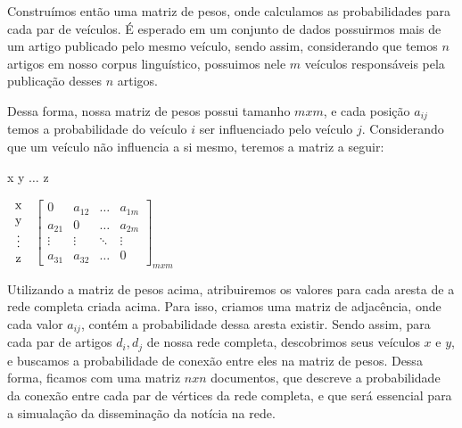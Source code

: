 \documentclass[a4paper,12pt]{article}
\begin{document}
 Construímos então uma matriz de pesos, onde calculamos as probabilidades para cada par de veículos. É esperado em um conjunto de 
 dados possuirmos mais de um artigo publicado pelo mesmo veículo, sendo assim, considerando que temos $n$ artigos em nosso corpus 
 linguístico, possuimos nele $m$ veículos responsáveis pela publicação desses $n$ artigos.

 Dessa forma, nossa matriz de pesos possui tamanho $mxm$, e cada posição $a_{ij}$ temos a probabilidade do veículo 
 $i$ ser influenciado pelo veículo $j$. Considerando que um veículo não influencia a si mesmo, teremos a matriz a seguir:
 
 \begin{center}
 \hspace{0.2cm}x \hspace{0.5cm} y \hspace{0.3cm} $\hdots$ \hspace{0.4cm}z
 
 \vspace{0.2cm}
 $
 \begin{tabular}{c}
   x \\
   y \\
   \vdots\\
   z
 \end{tabular}
$
 $
 \begin{bmatrix}
  0 & a_{12} & \hdots & a_{1m}\\
  a_{21} & 0 & \hdots & a_{2m}\\
  \vdots & \vdots & \ddots & \vdots\\
  a_{31} & a_{32} & \hdots & 0
 \end{bmatrix}_{mxm}
$

\end{center}

\vspace{0.4cm}

Utilizando a matriz de pesos acima, atribuiremos os valores para cada aresta de a rede completa criada acima. Para isso, criamos uma matriz
de adjacência, onde cada valor $a_{ij}$, contém a probabilidade dessa aresta existir.
Sendo assim, para cada par de artigos $d_{i},d_{j}$ de nossa rede completa,
descobrimos seus veículos $x$ e $y$, e buscamos a probabilidade de conexão entre eles na matriz de pesos. Dessa forma,
ficamos com uma matriz $nxn$ documentos, que descreve a probabilidade da conexão entre cada par de vértices da rede completa, e que será
essencial para a simualação da disseminação da notícia na rede.
  
\end{document}
